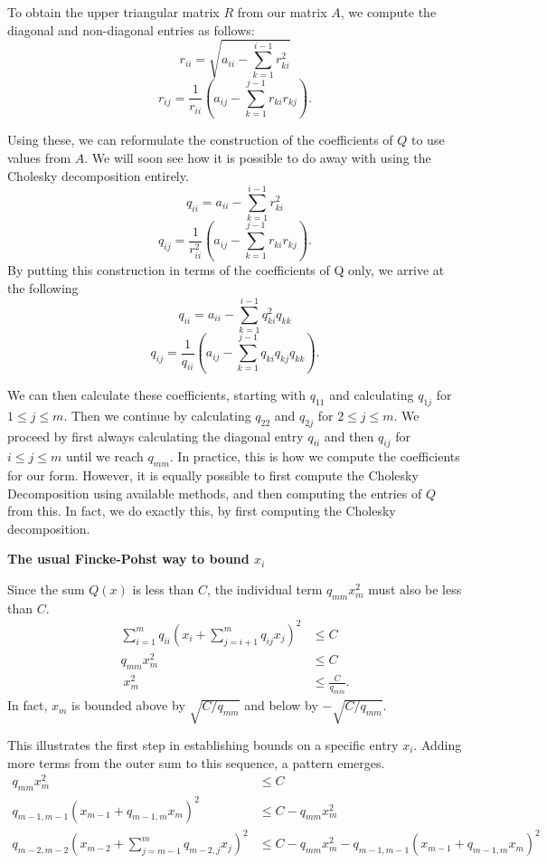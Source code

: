 To obtain the upper triangular matrix $R$ from our matrix $A$, we compute the diagonal and non-diagonal entries as follows:
\[r_{ii} = \sqrt{ a_{ii} - \sum_{k = 1}^{i-1}r_{ki}^2}\]
\[r_{ij} = \frac{1}{r_{ii}}\left( a_{ij} - \sum_{k = 1}^{j-1}r_{ki}r_{kj}\right).\]

Using these, we can reformulate the construction of the coefficients of $Q$ to use values from $A$. We will soon see how it is possible to do away with using the Cholesky decomposition entirely.
\[q_{ii} = a_{ii} - \sum_{k = 1}^{i-1}r_{ki}^2\]
\[q_{ij} = \frac{1}{r_{ii}^2}\left( a_{ij} - \sum_{k = 1}^{j-1}r_{ki}r_{kj}\right).\]
By putting this construction in terms of the coefficients of Q only, we arrive at the following
\[q_{ii} = a_{ii} - \sum_{k = 1}^{i-1}q_{ki}^2q_{kk}\]
\[q_{ij} = \frac{1}{q_{ii}}\left( a_{ij} - \sum_{k = 1}^{j-1}q_{ki}q_{kj}q_{kk}\right).\]

We can then calculate these coefficients, starting with $q_{11}$ and calculating $q_{1j}$ for $1 \leq j \leq m$. Then we continue by calculating $q_{22}$ and $q_{2j}$ for $2 \leq j \leq m$. We proceed by first always calculating the diagonal entry $q_{ii}$ and then $q_{ij}$ for $i \leq j \leq m$ until we reach $q_{mm}$.
In practice, this is how we compute the coefficients for our form. However, it is equally possible to first compute the Cholesky Decomposition using available methods, and then computing the entries of $Q$ from this. In fact, we do exactly this, by first computing the Cholesky decomposition.


\textbf{The usual Fincke-Pohst way to bound $x_i$}

Since the sum $Q(x)$ is less than $C$, the individual term $q_{mm}x_m^2$ must also be less than $C$.
\begin{align*}
\sum_{i=1}^m q_{ii}\left( x_i + \sum_{j=i+1}^m q_{ij}x_j\right)^2	& \leq C \\
q_{mm}x_m^2 & \leq C\\\
x_m^2 & \leq \frac{C}{q_{mm}}.
\end{align*}
In fact, $x_m$ is bounded above by $\sqrt{C/q_{mm}}$ and below by $-\sqrt{C/q_{mm}}$. 

This illustrates the first step in establishing bounds on a specific entry $x_i$. Adding more terms from the outer sum to this sequence, a pattern emerges.
\begin{align*}
q_{mm}x_m^2 & \leq C\\
q_{m-1, m-1}\left(x_{m-1} + q_{m-1,m}x_m\right)^2 & \leq C - q_{mm}x_m^2\\
q_{m-2, m-2}\left(x_{m-2} + \sum_{j = m-1}^m q_{m-2,j}x_j\right)^2 & \leq C - q_{mm}x_m^2 - q_{m-1, m-1}\left(x_{m-1} + q_{m-1,m}x_m\right)^2\\
\end{align*}

